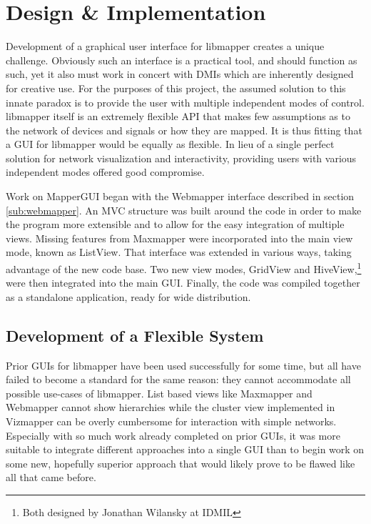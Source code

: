 \chapter{Design \& Implementation}

	Development of a graphical user interface for libmapper creates a unique challenge. Obviously such an interface is a practical tool, and should function as such, yet it also must work in concert with DMIs which are inherently designed for creative use. For the purposes of this project, the assumed solution to this innate paradox is to provide the user with multiple independent modes of control.  libmapper itself is an extremely flexible API that makes few assumptions as to the network of devices and signals or how they are mapped. It is thus fitting that a GUI for libmapper would be equally as flexible. In lieu of a single perfect solution for network visualization and interactivity, providing users with various independent modes offered good compromise.

	Work on MapperGUI began with the Webmapper interface described in section \ref{sub:webmapper}. An MVC structure was built around the code in order to make the program more extensible and to allow for the easy integration of multiple views. Missing features from Maxmapper were incorporated into the main view mode, known as ListView. That interface was extended in various ways, taking advantage of the new code base. Two new view modes, GridView and HiveView,\footnote{Both designed by Jonathan Wilansky at IDMIL} were then integrated into the main GUI. Finally, the code was compiled together as a standalone application, ready for wide distribution.

\section{Development of a Flexible System} %
\label{sec:development_of_a_flexible_system}

Prior GUIs for libmapper have been used successfully for some time, but all have failed to become a standard for the same reason: they cannot accommodate all possible use-cases of libmapper. List based views like Maxmapper and Webmapper cannot show hierarchies while the cluster view implemented in Vizmapper can be overly cumbersome for interaction with simple networks. Especially with so much work already completed on prior GUIs, it was more suitable to integrate different approaches into a single GUI than to begin work on some new, hopefully superior approach that would likely prove to be flawed like all that came before. 

